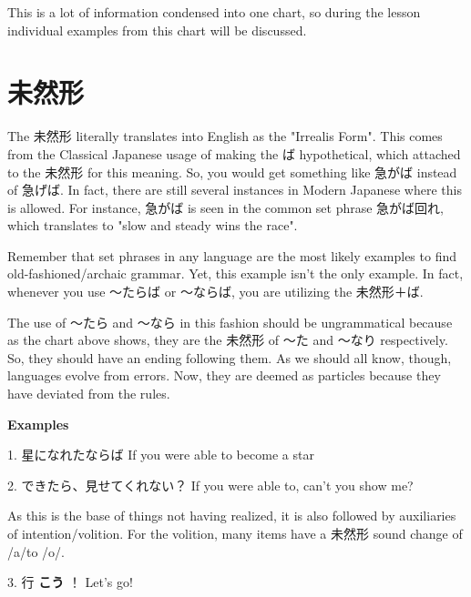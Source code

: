 \par{ This is a lot of information condensed into one chart, so during the lesson individual examples from this chart will be discussed. }
      
\section{未然形}
 
\par{ The 未然形 literally translates into English as the "Irrealis Form". This comes from the Classical Japanese usage of making the ば hypothetical, which attached to the 未然形 for this meaning. So, you would get something like 急がば instead of 急げば. In fact, there are still several instances in Modern Japanese where this is allowed. For instance, 急がば is seen in the common set phrase 急がば回れ, which translates to "slow and steady wins the race". }

\par{ Remember that set phrases in any language are the most likely examples to find old-fashioned\slash archaic grammar. Yet, this example isn't the only example. In fact, whenever you use ～たらば or ～ならば, you are utilizing the 未然形＋ば. }

\par{ The use of ～たら and ～なら in this fashion should be ungrammatical because as the chart above shows, they are the 未然形 of ～た and ～なり respectively. So, they should have an ending following them. As we should all know, though, languages evolve from errors. Now, they are deemed as particles because they have deviated from the rules. }

\begin{center}
\textbf{Examples }
\end{center}

\par{1. 星になれたならば \hfill\break
If you were able to become a star }

\par{2. できたら、見せてくれない？ \hfill\break
If you were able to, can't you show me? }

\par{ As this is the base of things not having realized, it is also followed by auxiliaries of intention\slash volition. For the volition, many items have a 未然形 sound change of \slash a\slash  to \slash o\slash . }

\par{3. 行 \textbf{こう }！ \hfill\break
Let's go! }

